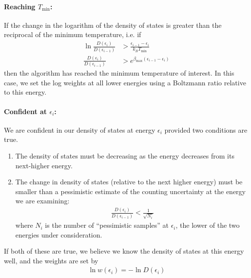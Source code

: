 \documentclass[letterpaper,twocolumn,amsmath,amssymb,pre,aps,10pt]{revtex4-1}
\begin{document}
\paragraph{Reaching $T_{\min}$:}
If the change in the logarithm of the density of states is greater
than the reciprocal of the minimum temperature, i.e. if
\begin{align}
  \ln\frac{D(\epsilon_i)}{D(\epsilon_{i-1})} &>
  \frac{\epsilon_{i-1} - \epsilon_i}{k_BT_{\min}}
  \\
  \frac{D(\epsilon_i)}{D(\epsilon_{i-1})} &>
  e^{\beta_{\max}(\epsilon_{i-1} - \epsilon_i)}
\end{align}
then the algorithm has reached the minimum temperature of interest.
In this case, we set the log weights at all lower energies using a
Boltzmann ratio relative to this energy.
\paragraph{Confident at $\epsilon_i$:} We are confident in our density
of states at energy $\epsilon_i$ provided two conditions are true.
\begin{enumerate}
\item The density of states must be decreasing as the energy decreases
  from its next-higher energy.
\item The change in density of states (relative to the next higher
  energy) must be smaller than a pessimistic estimate of the counting
  uncertainty at the energy we are examining:
  \begin{align}
    \frac{D(\epsilon_i)}{D(\epsilon_{i-1})} < \frac1{\sqrt{N_i}}
  \end{align}
  where $N_i$ is the number of ``pessimistic
  samples'' at $\epsilon_i$, the lower of the two energies under
  consideration.
\end{enumerate}
If both of these are true, we believe we know the density of states at
this energy well, and the weights are set by
\begin{align}
  \ln w(\epsilon_i) = -\ln{D}(\epsilon_i)
\end{align}
\end{document}
